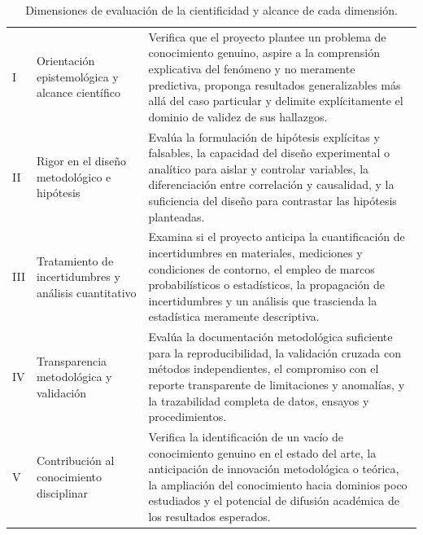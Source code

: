 \begin{table}[htbp]
\centering
\scriptsize
\caption{Dimensiones de evaluación de la cientificidad y alcance de cada dimensión.}
\label{tab:dim-cientificidad}
\begin{tabularx}{\textwidth}{|C{0.8cm}|L{4.5cm}|X|}
\hline
{}
 &  &  \\ \hline
I & Orientación epistemológica y alcance científico & Verifica que el proyecto plantee un problema de conocimiento genuino, aspire a la comprensión explicativa del fenómeno y no meramente predictiva, proponga resultados generalizables más allá del caso particular y delimite explícitamente el dominio de validez de sus hallazgos. \\ \hline
{}
II & Rigor en el diseño metodológico e hipótesis & Evalúa la formulación de hipótesis explícitas y falsables, la capacidad del diseño experimental o analítico para aislar y controlar variables, la diferenciación entre correlación y causalidad, y la suficiencia del diseño para contrastar las hipótesis planteadas. \\ \hline
III & Tratamiento de incertidumbres y análisis cuantitativo & Examina si el proyecto anticipa la cuantificación de incertidumbres en materiales, mediciones y condiciones de contorno, el empleo de marcos probabilísticos o estadísticos, la propagación de incertidumbres y un análisis que trascienda la estadística meramente descriptiva. \\ \hline
{}
IV & Transparencia metodológica y validación & Evalúa la documentación metodológica suficiente para la reproducibilidad, la validación cruzada con métodos independientes, el compromiso con el reporte transparente de limitaciones y anomalías, y la trazabilidad completa de datos, ensayos y procedimientos. \\ \hline
V & Contribución al conocimiento disciplinar & Verifica la identificación de un vacío de conocimiento genuino en el estado del arte, la anticipación de innovación metodológica o teórica, la ampliación del conocimiento hacia dominios poco estudiados y el potencial de difusión académica de los resultados esperados. \\ \hline
\end{tabularx}
\end{table}
